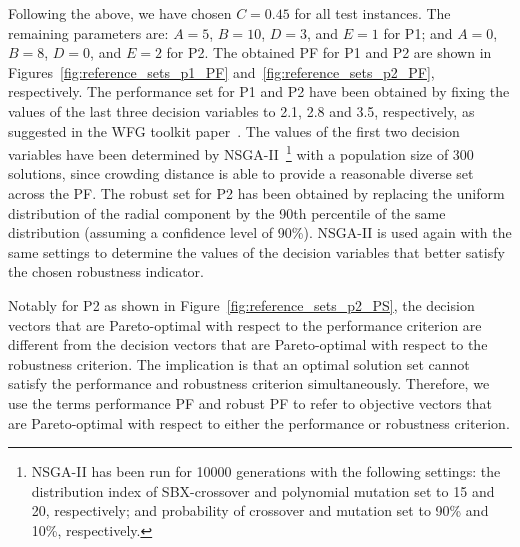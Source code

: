\documentclass{llncs}
\begin{document}
Following the above, we have chosen $C=0.45$ for all test instances. The remaining parameters are: $A=5$, $B=10$, $D=3$, and $E=1$ for P1; and $A=0$, $B=8$, $D=0$, and $E=2$ for P2. The obtained PF for P1 and P2 are shown in Figures~\ref{fig:reference_sets_p1_PF} and~\ref{fig:reference_sets_p2_PF}, respectively. The performance set for P1 and P2 have been obtained by fixing the values of the last three decision variables to 2.1, 2.8 and 3.5, respectively, as suggested in the WFG toolkit paper~\cite{bib:wfg_2006}. The values of the first two decision variables have been determined by NSGA-II~\cite{deb2002fast}\footnote{NSGA-II has been run for 10000 generations with the following settings: the distribution index of SBX-crossover and polynomial mutation set to 15 and 20, respectively; and probability of crossover and mutation set to 90\% and 10\%, respectively.} with a population size of 300 solutions, since crowding distance is able to provide a reasonable diverse set across the PF. The robust set for P2 has been obtained by replacing the uniform distribution of the radial component by the 90th percentile of the same distribution (assuming a confidence level of 90\%). NSGA-II is used again with the same settings to determine the values of the decision variables that better satisfy the chosen robustness indicator.

Notably for P2 as shown in Figure~\ref{fig:reference_sets_p2_PS}, the decision vectors that are Pareto-optimal with respect to the performance criterion are different from the decision vectors that are Pareto-optimal with respect to the robustness criterion. The implication is that an optimal solution set cannot satisfy the performance and robustness criterion simultaneously. Therefore, we use the terms performance PF and robust PF to refer to objective vectors that are Pareto-optimal with respect to either the performance or robustness criterion.
\end{document}
